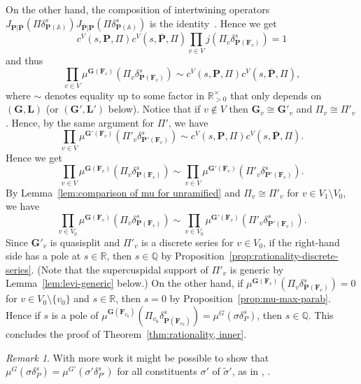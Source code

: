 \documentclass[a4paper]{amsart}
\numberwithin{equation}{section}
\theoremstyle{remark}
\newtheorem{remark}[thm]{Remark}
\theoremstyle{definition}
\newcommand{\Q}{\mathbb{Q}}
\newcommand{\R}{\mathbb{R}}
\newcommand{\glob}[1]{\boldsymbol{#1}}
\renewcommand{\simeq}{\cong}
\begin{document}
On the other hand, the composition of intertwining operators $J_{\glob{P}|\overline{\glob{P}}}(\Pi\delta_{\glob{P}(\mathbb{A})}^{s})J_{\overline{\glob{P}}|\glob{P}}(\Pi\delta_{\glob{P}(\mathbb{A})}^{s})$ is the identity~\cite[Theorem IV.1.10]{MR1361168}.
Hence we get
\[
c^{V}(s,\glob{P},\Pi)c^{V}(s,\overline{\glob{P}},\Pi)\prod_{v\in V}j(\Pi_{v}\delta_{\glob{P}(\glob{F}_{v})}^{s}) = 1
\]
and thus
\[
\prod_{v\in V}\mu^{\glob{G}(\glob{F}_{v})}(\Pi_{v}\delta_{\glob{P}(\glob{F}_{v})}^{s}) \sim c^{V}(s,\glob{P},\Pi)c^{V}(s,\overline{\glob{P}},\Pi),
\]
where $\sim$ denotes equality up to some factor in $\R_{>0}^\times$ that only depends on $(\glob{G},\glob{L})$ (or $(\glob{G}',\glob{L}')$ below).
Notice that if $v\notin V$ then $\glob{G}_{v}\simeq \glob{G}'_{v}$ and $\Pi_{v}\simeq \Pi'_{v}$.
Hence, by the same argument for $\Pi'$, we have
\[
\prod_{v\in V}\mu^{\glob{G}'(\glob{F}_{v})}(\Pi'_{v}\delta_{\glob{P}'(\glob{F}_{v})}^{s}) \sim c^{V}(s,\glob{P},\Pi)c^{V}(s,\overline{\glob{P}},\Pi).
\]
Hence we get
\[
\prod_{v\in V}\mu^{\glob{G}(\glob{F}_{v})}(\Pi_{v}\delta_{\glob{P}(\glob{F}_{v})}^{s})
\sim
\prod_{v\in V}\mu^{\glob{G}'(\glob{F}_{v})}(\Pi'_{v}\delta_{\glob{P}'(\glob{F}_{v})}^{s}).
\]
By Lemma~\ref{lem:comparison of mu for unramified} and $\Pi_{v}\simeq \Pi'_{v}$ for $v\in V_{1}\setminus V_{0}$, we have
\[
\prod_{v\in V_{0}}\mu^{\glob{G}(\glob{F}_{v})}(\Pi_{v}\delta_{\glob{P}(\glob{F}_{v})}^{s})
\sim
\prod_{v\in V_{0}}\mu^{\glob{G}'(\glob{F}_{v})}(\Pi'_{v}\delta_{\glob{P}'(\glob{F}_{v})}^{s}).
\]
Since $\glob{G}'_{v}$ is quasisplit and $\Pi'_{v}$ is a discrete series for $v \in V_0$, if the right-hand side has a pole at $s \in \R$, then $s\in \Q$ by Proposition~\ref{prop:rationality-discrete-series}.
(Note that the supercuspidal support of $\Pi'_{v}$ is generic by Lemma~\ref{lem:levi-generic} below.) On the other hand, if $\mu^{\glob{G}(\glob{F}_{v})}(\Pi_{v}\delta_{\glob{P}(\glob{F}_{v})}^{s}) = 0$ for $v\in V_{0}\setminus\{v_{0}\}$ and $s \in \R$, then $s = 0$ by Proposition~\ref{prop:mu-max-parab}.
Hence if $s$ is a pole of $\mu^{\glob{G}(\glob{F}_{v_{0}})}(\Pi_{v_{0}}\delta_{\glob{P}(\glob{F}_{v_{0}})}^{s}) = \mu^{G}(\sigma\delta_{P}^{s})$, then $s\in \Q$.
This concludes the proof of Theorem~\ref{thm:rationality, inner}.

\begin{remark}
  With more work it might be possible to show that $\mu^G(\sigma \delta_P^s) = \mu^{G'}(\sigma' \delta_{P'}^s)$ for all constituents $\sigma'$ of $\widetilde{\sigma}'$, as in \cite{MR1749954}, \cite{MR3194161}.
\end{remark}
\end{document}
